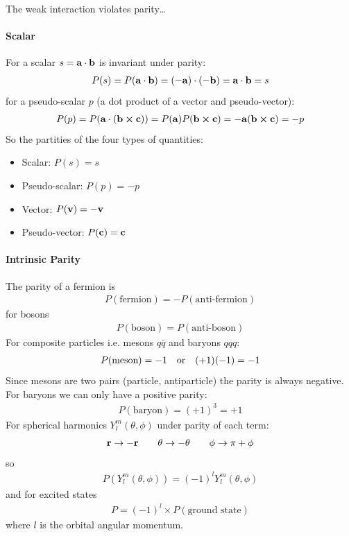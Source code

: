 \documentclass[../main.tex]{subfiles}
\begin{document}
The weak interaction violates parity\dots

\paragraph*{Scalar} For a scalar $s = \vb{a} \cdot \vb{b}$ is invariant under parity:
\begin{align*}
    P(s) = P(\vb{a} \cdot \vb{b}) = (-\vb{a}) \cdot (-\vb{b}) = \vb{a} \cdot \vb{b} = s
\end{align*} 
for a pseudo-scalar $p$ (a dot product of a vector and pseudo-vector):
\begin{align*}
    P(p) = P(\vb{a} \cdot (\vb{b} \cross \vb{c})) = P(\vb{a}) P(\vb{b} \cross \vb{c})
    = -\vb{a} (\vb{b} \cross \vb{c}) = -p
\end{align*}
So the partities of the four types of quantities:
\begin{itemize}
    \item Scalar: $P(s) = s$
    \item Pseudo-scalar: $P(p) = -p$
    \item Vector: $P(\vb{v}) = -\vb{v}$
    \item Pseudo-vector: $P(\vb{c}) = \vb{c}$
\end{itemize}

\paragraph*{Intrinsic Parity} The parity of a fermion is
\begin{align*}
    P(\text{fermion}) = - P(\text{anti-fermion})
\end{align*}
for bosons
\begin{align*}
    P(\text{boson}) = P(\text{anti-boson})
\end{align*}
For composite particles i.e. mesons $q\bar q$ and baryons $qqq$:
\begin{align*}
    P(\text{meson}) = -1 \qor (+1)(-1) = -1
\end{align*}
Since mesons are two pairs (particle, antiparticle) the parity is always negative. For baryons we 
can only have a positive parity:
\begin{align*}
    P(\text{baryon}) = (+1)^3 = +1
\end{align*}
For spherical harmonics $Y_l^m(\theta,\phi)$
under parity of each term:
\begin{align*}
    \vb{r} \to -\vb{r} \qquad \theta \to - \theta \qquad \phi \to \pi + \phi
\end{align*}
so
\begin{align*}
    P(Y_l^m(\theta, \phi)) = (-1)^l Y_l^m(\theta, \phi)
\end{align*}
and for excited states
\begin{align*}
    P = (-1)^l \times P(\text{ground state})
\end{align*}
where $l$ is the orbital angular momentum.
\end{document}
